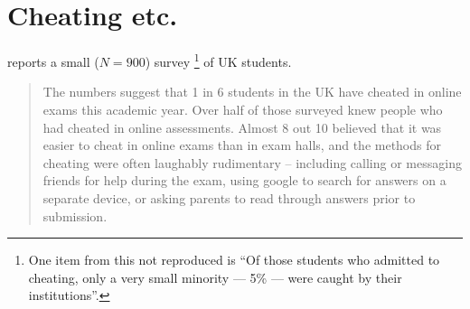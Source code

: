 \documentclass{article}
\begin{document}
\section{Cheating etc.}
\citet{Dickinson2022a} reports a small ($N=900$) survey \citep{AcademicAppeals2022a}\footnote{One item from this not reproduced is ``Of those students who admitted to cheating, only a very small minority --- 5\% --- were caught by their institutions''. } of UK students.
\begin{quote}
  The numbers suggest that 1 in 6 students in the UK have cheated in online exams this academic year. Over half of those surveyed knew people who had cheated in online assessments. Almost 8 out 10 believed that it was easier to cheat in online exams than in exam halls, and the methods for cheating were often laughably rudimentary – including calling or messaging friends for help during the exam, using google to search for answers on a separate device, or asking parents to read through answers prior to submission.
\end{quote}

\end{document}
